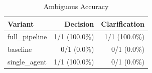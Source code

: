 \begin{table}[htbp]
\centering
\caption{Ambiguous Accuracy}
\label{tab:acc-ambig}
\begin{tabular}{l rr}
\toprule
Variant & Decision & Clarification \\
\midrule
  full\_pipeline & 1/1 (100.0\%) & 1/1 (100.0\%) \\
  baseline & 0/1 (0.0\%) & 0/1 (0.0\%) \\
  single\_agent & 1/1 (100.0\%) & 0/1 (0.0\%) \\
\bottomrule
\end{tabular}
\end{table}
